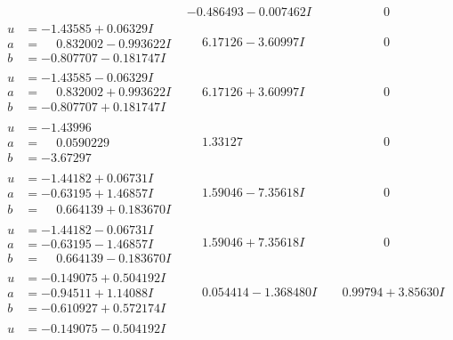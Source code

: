 \documentclass[1p]{elsarticle_modified}
\theoremstyle{definition}
\begin{document}
$$\begin{array}{c|c|c}
 & -0.486493 - 0.007462 I & \phantom{-0.000000 } 0 \\ \hline\begin{aligned}
u &= -1.43585 + 0.06329 I \\
a &= \phantom{-}0.832002 - 0.993622 I \\
b &= -0.807707 - 0.181747 I\end{aligned}
 & \phantom{-}6.17126 - 3.60997 I & \phantom{-0.000000 } 0 \\ \hline\begin{aligned}
u &= -1.43585 - 0.06329 I \\
a &= \phantom{-}0.832002 + 0.993622 I \\
b &= -0.807707 + 0.181747 I\end{aligned}
 & \phantom{-}6.17126 + 3.60997 I & \phantom{-0.000000 } 0 \\ \hline\begin{aligned}
u &= -1.43996\phantom{ +0.000000I} \\
a &= \phantom{-}0.0590229\phantom{ +0.000000I} \\
b &= -3.67297\phantom{ +0.000000I}\end{aligned}
 & \phantom{-}1.33127\phantom{ +0.000000I} & \phantom{-0.000000 } 0 \\ \hline\begin{aligned}
u &= -1.44182 + 0.06731 I \\
a &= -0.63195 + 1.46857 I \\
b &= \phantom{-}0.664139 + 0.183670 I\end{aligned}
 & \phantom{-}1.59046 - 7.35618 I & \phantom{-0.000000 } 0 \\ \hline\begin{aligned}
u &= -1.44182 - 0.06731 I \\
a &= -0.63195 - 1.46857 I \\
b &= \phantom{-}0.664139 - 0.183670 I\end{aligned}
 & \phantom{-}1.59046 + 7.35618 I & \phantom{-0.000000 } 0 \\ \hline\begin{aligned}
u &= -0.149075 + 0.504192 I \\
a &= -0.94511 + 1.14088 I \\
b &= -0.610927 + 0.572174 I\end{aligned}
 & \phantom{-}0.054414 - 1.368480 I & \phantom{-}0.99794 + 3.85630 I \\ \hline\begin{aligned}
u &= -0.149075 - 0.504192 I \\

\end{aligned}
\end{array}$$
\end{document}
